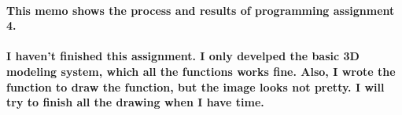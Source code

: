 \documentclass[a4paper,12pt]{texMemo}
\begin{document}
\maketitle

\paragraph{This memo shows the process and results of programming assignment 4.}
\paragraph{I haven't finished this assignment. I only develped the basic 3D modeling system, which all the functions works fine. Also, I wrote the function to draw the function, but the image looks not pretty. I will try to finish all the drawing when I have time.}
\end{document}
